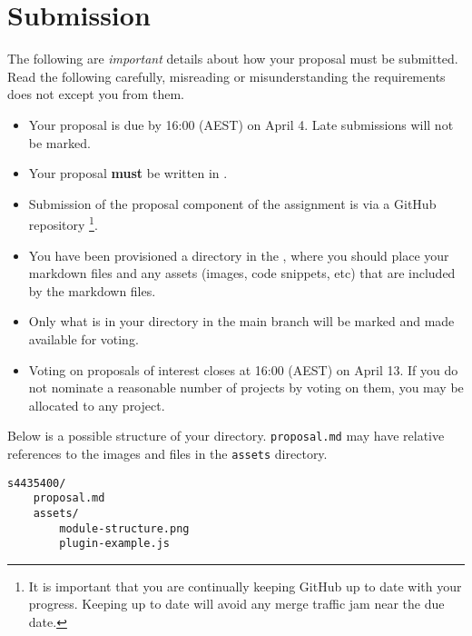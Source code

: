 \documentclass{csse4400}
\begin{document}
\section{Submission}

The following are \emph{important} details about how your proposal must be submitted.
Read the following carefully, misreading or misunderstanding the requirements does not except you from them.

\begin{itemize}
    \item Your proposal is due by 16:00 (AEST) on April 4. Late submissions will not be marked.
    \item Your proposal \textbf{must} be written in .
    \item Submission of the proposal component of the assignment is via a GitHub repository%
             \footnote{It is important that you are continually keeping GitHub up to date with your progress.
              Keeping up to date will avoid any merge traffic jam near the due date.}.
    \item You have been provisioned a directory in the ,
             where you should place your markdown files and any assets (images, code snippets, etc) that are included by the markdown files.
	\item Only what is in your directory in the main branch will be marked and made available for voting.
    \item Voting on proposals of interest closes at 16:00 (AEST) on April 13.
             If you do not nominate a reasonable number of projects by voting on them, you may be allocated to any project.
\end{itemize}

\noindent
Below is a possible structure of your directory.
\texttt{proposal.md} may have relative references to the images and files in the \texttt{assets} directory.

\begin{verbatim}
s4435400/
    proposal.md
    assets/
        module-structure.png
        plugin-example.js
\end{verbatim}
\end{document}

